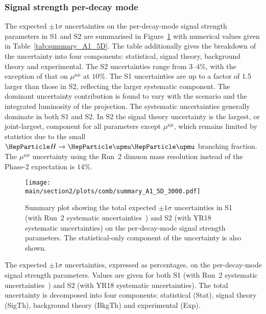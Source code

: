 \subsubsection{Signal strength per-decay mode}

The expected $\pm 1\sigma$ uncertainties on the per-decay-mode signal strength parameters in S1 and S2 are summarised in Figure~\ref{fig:summary_A1_5D} with numerical values given in Table~\ref{tab:summary_A1_5D}. The table additionally gives the breakdown of the uncertainty into four components: statistical, signal theory, background theory and experimental. The S2 uncertainties range from $3$--$4\%$, with the exception of that on $\mu^{\mu\mu}$ at $10\%$. The S1 uncertainties are up to a factor of 1.5 larger than those in S2, reflecting the larger systematic component. The dominant uncertainty contribution is found to vary with the scenario and the integrated luminosity of the projection. The systematic uncertainties generally dominate in both S1 and S2. In S2 the signal theory uncertainty is the largest, or joint-largest, component for all parameters except $\mu^{\mu\mu}$, which remains limited by statistics due to the small $\hmm$ branching fraction. The $\mu^{\mu\mu}$ uncertainty using the Run~2 dimuon mass resolution instead of the Phase-2 expectation is $14\%$.


\begin{figure}[hbtp]
\centering
\texttt{[image: \\main/section2/plots/comb/summary\_A1\_5D\_3000.pdf]}%
\caption{Summary plot showing the total expected $\pm 1\sigma$ uncertainties in S1 (with Run~2 systematic uncertainties~\cite{Sirunyan:2018koj}) and S2 (with YR18 systematic uncertainties) on the per-decay-mode signal strength parameters. The statistical-only component of the uncertainty is also shown.}
\label{fig:summary_A1_5D}
\end{figure}


\begin{table}[hbtp]
\centering
\caption{The expected $\pm 1\sigma$ uncertainties, expressed as percentages, on the per-decay-mode signal strength parameters. Values are given for both S1 (with Run~2 systematic uncertainties~\cite{Sirunyan:2018koj}) and S2 (with YR18 systematic uncertainties). The total uncertainty is decomposed into four components: statistical (Stat), signal theory (SigTh), background theory (BkgTh) and experimental (Exp).}

\label{tab:summary_A1_5D}
\vspace{0.5cm}
\end{table}

